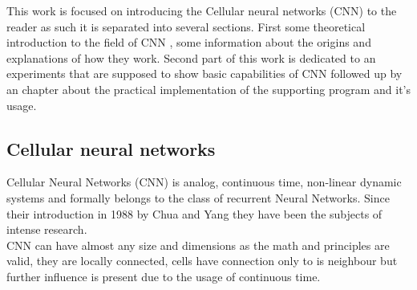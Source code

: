This work is focused on introducing the Cellular neural networks (CNN) to the reader as such it is separated into several sections. First some theoretical introduction to the field of CNN , some information about the origins and explanations of how they work. Second part of this work is dedicated to an experiments that are supposed to show basic capabilities of CNN followed up by an chapter about the practical implementation of the supporting program and it's usage. 


\subsection{Cellular neural networks}
Cellular Neural Networks (CNN) is analog, continuous time, non-linear dynamic
systems and formally belongs to the class of recurrent Neural Networks. Since
their introduction in 1988 by Chua and Yang \cite{Chua-Yang} they have been the subjects of
intense research. \\
CNN can have almost any size and dimensions as the math and principles are valid, they are locally connected, cells have connection only to is neighbour but further influence is present due to the usage of continuous time. 
